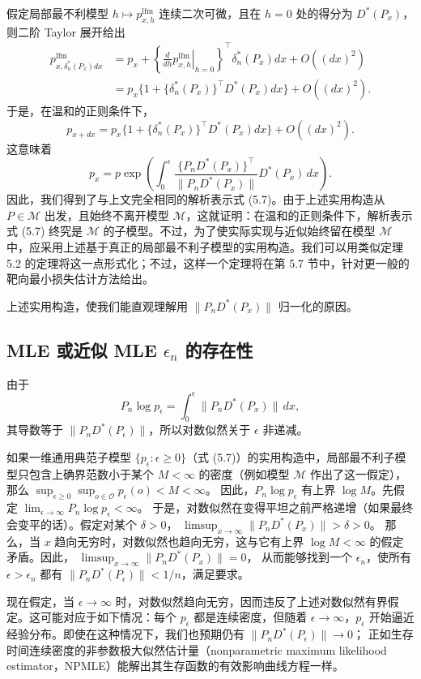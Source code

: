 假定局部最不利模型 $h\mapsto p_{x,h}^{\mathrm{lfm}}$ 连续二次可微，且在 $h=0$ 处的得分为 $D^*(P_x)$，则二阶 Taylor 展开给出
\[
 \begin{aligned}
 p_{x,\delta_n^*(P_x)dx}^{\mathrm{lfm}}
 &=p_x+\left\{
 \left.\frac{d}{dh}p_{x,h}^{\mathrm{lfm}}\right|_{h=0}
 \right\}^{\top}\delta_n^*(P_x)dx+O((dx)^2)\\
 &=p_x\{1+\{\delta_n^*(P_x)\}^\top D^*(P_x)dx\}
 +O((dx)^2).
 \end{aligned}
\]
于是，在温和的正则条件下，
\[
 p_{x+dx}=p_x\{1+\{\delta_n^*(P_x)\}^\top D^*(P_x)dx\}
 +O((dx)^2).
\]
这意味着
\[
 p_x=p\exp\left(\int_0^\epsilon
 \frac{\{P_nD^*(P_x)\}^\top}{\|P_nD^*(P_x)\|}
 D^*(P_x)\,dx\right).
\]
因此，我们得到了与上文完全相同的解析表示式 (5.7)。由于上述实用构造从 $P\in\mathcal M$ 出发，且始终不离开模型 $\mathcal M$，这就证明：在温和的正则条件下，解析表示式 (5.7) 终究是 $\mathcal M$ 的子模型。不过，为了使实际实现与近似始终留在模型 $\mathcal M$ 中，应采用上述基于真正的局部最不利子模型的实用构造。我们可以用类似定理 5.2 的定理将这一点形式化；不过，这样一个定理将在第 5.7 节中，针对更一般的靶向最小损失估计方法给出。

上述实用构造，使我们能直观理解用 $\|P_nD^*(P_x)\|$ 归一化的原因。

\subsection{MLE 或近似 MLE \texorpdfstring{$\epsilon_n$}{εn} 的存在性}

由于
\[
 P_n\log p_\epsilon=\int_0^\epsilon\|P_nD^*(P_x)\|\,dx,
\]
其导数等于 $\|P_nD^*(P_\epsilon)\|$，所以对数似然关于 $\epsilon$ 非递减。

如果一维通用典范子模型 $\{p_\epsilon:\epsilon\geq0\}$（式 (5.7)）的实用构造中，局部最不利子模型只包含上确界范数小于某个 $M<\infty$ 的密度（例如模型 $\mathcal M$ 作出了这一假定），那么
$\sup_{\epsilon\geq0}\sup_{o\in\mathcal O}p_\epsilon(o)<M<\infty$。
因此，$P_n\log p_\epsilon$ 有上界 $\log M$。先假定
$\lim_{\epsilon\to\infty}P_n\log p_\epsilon<\infty$。
于是，对数似然在变得平坦之前严格递增（如果最终会变平的话）。假定对某个 $\delta>0$，
$\limsup_{x\to\infty}\|P_nD^*(P_x)\|>\delta>0$。
那么，当 $x$ 趋向无穷时，对数似然也趋向无穷，这与它有上界 $\log M<\infty$ 的假定矛盾。因此，
$\limsup_{x\to\infty}\|P_nD^*(P_x)\|=0$，
从而能够找到一个 $\epsilon_n$，使所有 $\epsilon>\epsilon_n$ 都有
$\|P_nD^*(P_\epsilon)\|<1/n$，满足要求。

现在假定，当 $\epsilon\to\infty$ 时，对数似然趋向无穷，因而违反了上述对数似然有界假定。这可能对应于如下情况：每个 $p_\epsilon$ 都是连续密度，但随着 $\epsilon\to\infty$，$p_\epsilon$ 开始逼近经验分布。即使在这种情况下，我们也预期仍有
$\|P_nD^*(P_\epsilon)\|\to0$；
正如生存时间连续密度的非参数极大似然估计量（nonparametric maximum likelihood estimator，NPMLE）能解出其生存函数的有效影响曲线方程一样。

